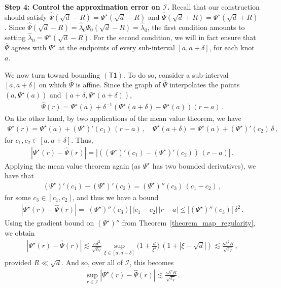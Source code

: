 \documentclass[twoside]{article}
\newcommand{\cI}{\mathcal{I}}
\newcommand{\1}{\mathds{1}}
\theoremstyle{plain}
\theoremstyle{definition}
\theoremstyle{remark}
\begin{document}
\textbf{Step 4: Control the approximation error on $\cI$.}
Recall that our construction should satisfy $\hat\Psi(\sqrt d-R) = \Psi^\star(\sqrt d-R)$ and $\hat\Psi(\sqrt d + R) = \Psi^\star(\sqrt d + R)$.
Since $\hat\Psi(\sqrt d - R) = \hat\lambda_0 \Psi_0(\sqrt d - R) = \hat\lambda_0$, the first condition amounts to setting $\hat\lambda_0 = \Psi^\star(\sqrt d-R)$.
For the second condition, we will in fact ensure that $\hat\Psi$ agrees with $\Psi^\star$ at the endpoints of every sub-interval $[a,a+\delta]$, for each knot $a$.

We now turn toward bounding $(\mathsf{T1})$. To do so, consider a sub-interval $[a,a+\delta]$ on which $\hat\Psi$ is affine.
Since the graph of $\hat\Psi$ interpolates the points $(a, \Psi^{\star}(a))$ and $(a+\delta, \Psi^{\star}(a+\delta))$,
\begin{align*}
    \hat{\Psi}(r)= \Psi^{\star}(a) + \delta^{-1} \left(\Psi^{\star}(a+\delta) - \Psi^{\star}(a) \right)(r-a)\,.
\end{align*}
On the other hand, by two applications of the mean value theorem, we have
\begin{align*}
    \Psi^{\star}(r) = \Psi^{\star}(a) + (\Psi^{\star})'(c_1)\,(r-a)\,, \quad \Psi^\star(a+\delta) = \Psi^\star(a) + (\Psi^\star)'(c_2)\,\delta\,,
\end{align*}
for $c_1,c_2 \in [a,a+\delta]$. Thus,
\begin{align*}
    |\Psi^\star(r) - \hat\Psi(r)| = |((\Psi^\star)'(c_1) - (\Psi^\star)'(c_2))\,(r-a)|\,.
\end{align*}
Applying the mean value theorem again (as $\Psi^\star$ has two bounded derivatives), we have that
\begin{align*}
    (\Psi^\star)'(c_1) - (\Psi^\star)'(c_2) = (\Psi^\star)''(c_3)\,(c_1-c_2)\,,
\end{align*}
for some $c_3 \in [c_1,c_2]$, and thus we have a bound
\begin{align*}
    |\Psi^\star(r) - \hat\Psi(r)| = |(\Psi^\star)''(c_3)|\,|c_1-c_2|\,|r-a|\leq |(\Psi^\star)''(c_3)|\, \delta^2\,.
\end{align*}
Using the gradient bound on $(\Psi^\star)''$ from Theorem~\ref{theorem_map_regularity}, we obtain
\begin{align*}
    |\Psi^\star(r) - \hat\Psi(r)| \lesssim \frac{\kappa\delta^2}{\sqrt{\ell_V}}\sup_{\xi\in[a,a+\delta]}\bigl(1 + \frac{d}{\xi^2}\bigr)\,(1+|\xi-\sqrt d|)
    \lesssim \frac{\kappa \delta^2 R}{\sqrt{\ell_V}}\,,
\end{align*}
provided $R \ll \sqrt d$.
And so, over all of $\cI$, this becomes
\begin{align*}
    \sup_{r \in \cI}|\Psi^\star(r) - \hat\Psi(r)| \lesssim \frac{\kappa\delta^2 R}{\sqrt{\ell_V}}\,.
\end{align*}
\end{document}
